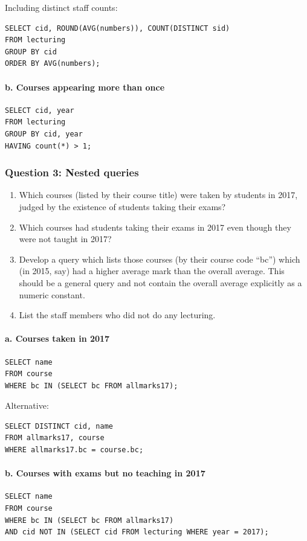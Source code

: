 Including distinct staff counts:
\begin{verbatim}
SELECT cid, ROUND(AVG(numbers)), COUNT(DISTINCT sid)
FROM lecturing
GROUP BY cid
ORDER BY AVG(numbers);
\end{verbatim}

\paragraph{b. Courses appearing more than once}
\begin{verbatim}
SELECT cid, year
FROM lecturing
GROUP BY cid, year
HAVING count(*) > 1;
\end{verbatim}

\subsubsection{Question 3: Nested queries}
\begin{enumerate}[label=\alph*)]
\item Which courses (listed by their course title) were taken by students in 2017, judged by the existence of students taking their exams?

\item Which courses had students taking their exams in 2017 even though they were not taught in 2017?

\item Develop a query which lists those courses (by their course code ``bc'') which (in 2015, say) had a higher average mark than the overall average. This should be a general query and not contain the overall average explicitly as a numeric constant.

\item List the staff members who did not do any lecturing.
\end{enumerate}

\paragraph{a. Courses taken in 2017}
\begin{verbatim}
SELECT name
FROM course
WHERE bc IN (SELECT bc FROM allmarks17);
\end{verbatim}

Alternative:
\begin{verbatim}
SELECT DISTINCT cid, name
FROM allmarks17, course
WHERE allmarks17.bc = course.bc;
\end{verbatim}

\paragraph{b. Courses with exams but no teaching in 2017}
\begin{verbatim}
SELECT name
FROM course
WHERE bc IN (SELECT bc FROM allmarks17)
AND cid NOT IN (SELECT cid FROM lecturing WHERE year = 2017);
\end{verbatim}

